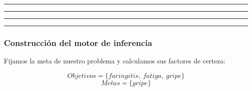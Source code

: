 \documentclass[a4paper,11pt, includehead]{article}
\begin{document}
\vspace{10ex}

\hrule

\hrule

\clearpage

\hrule

\hrule

\vspace{3ex}


\subsubsection{Construcción del motor de inferencia}
\noindent Fijamos la meta de nuestro problema y calculamos sus factores de certeza:

$$Objetivos=\{faringitis,\ fatiga,\ gripe\}$$
$$Metas=\{gripe\}$$
\end{document}
